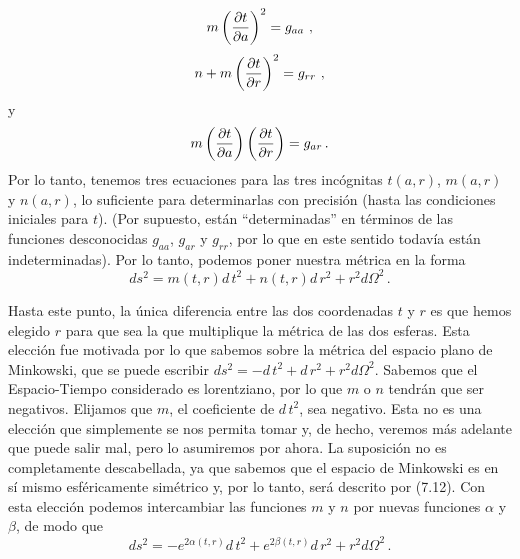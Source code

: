 \documentclass[11pt,b5paper,openany,twoside]{book}
\begin{document}
\begin{equation}
m\left({{\partial t}\over{\partial a}}\right)^2 = g_{aa}\ ,\label{7.9}
\end{equation}
\begin{equation}
n+m\left({{\partial t}\over{\partial r}}\right)^2 = g_{rr}\ ,\label{7.10}
\end{equation}
y
\begin{equation}
m\left({{\partial t}\over{\partial a}}\right)\left({{\partial t}\over
{\partial r}}\right)=g_{ar}\,.\label{7.11}
\end{equation}
Por lo tanto, tenemos tres ecuaciones para las tres incógnitas $t(a,r)$, $m(a,r)$ y $n(a,r)$, lo suficiente para determinarlas con precisión (hasta las condiciones iniciales para $t$).
(Por supuesto, están ``determinadas'' en términos de las funciones desconocidas $g_{aa}$, $g_{ar}$ y $g_{rr}$, por lo que en este sentido todavía están indeterminadas).
Por lo tanto, podemos poner nuestra métrica en la forma
\begin{equation}
ds^2 = m(t,r) d\,t^2 + n(t,r) d\,r^2+ r^2 d\Omega^2\,.\label{7.12}
\end{equation}

Hasta este punto, la única diferencia entre las dos coordenadas $t$ y $r$ es que hemos elegido $r$ para que sea la que multiplique la métrica de las dos esferas.
Esta elección fue motivada por lo que sabemos sobre la métrica del espacio plano de Minkowski, que se puede escribir $ds^2 = - d\,t^2 +  d\,r^2+ r^2 d\Omega^2$.
Sabemos que el Espacio-Tiempo considerado es lorentziano, por lo que $m$ o $n$ tendrán que ser negativos.
Elijamos que $m$, el coeficiente de $ d\,t^2$, sea negativo.
Esta no es una elección que simplemente se nos permita tomar y, de hecho, veremos más adelante que puede salir mal, pero lo asumiremos por ahora.
La suposición no es completamente descabellada, ya que sabemos que el espacio de Minkowski es en sí mismo esféricamente simétrico y, por lo tanto, será descrito por (7.12).
Con esta elección podemos intercambiar las funciones $m$ y $n$ por nuevas funciones $\alpha$ y $\beta$, de modo que
\begin{equation}
ds^2 = -e^{2\alpha(t,r)} d\,t^2 + e^{2\beta(t,r)} d\,r^2
+ r^2 d\Omega^2\,.\label{7.13}
\end{equation}
\end{document}
